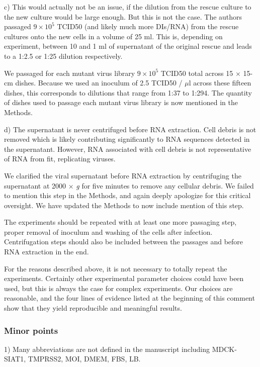 \documentclass[11pt, oneside]{article}   	%
\newcommand{\response}[1]{{\color{black}#1}}
\begin{document}
c) This would actually not be an issue, if the dilution from the rescue culture to the new culture would be large enough. But this is not the case. The authors passaged $9\times10^5$ TCID50 (and likely much more DIs/RNA) from the rescue cultures onto the new cells in a volume of 25 ml. This is, depending on experiment, between 10 and 1 ml of supernatant of the original rescue and leads to a 1:2.5 or 1:25 dilution respectively. 

\response{We passaged for each mutant virus library $9\times10^5$ TCID50 total across 15 $\times$ 15-cm dishes.
Because we used an inoculum of 2.5 TCID50 / $\mu$l across these fifteen dishes, this corresponds to dilutions that range from 1:37 to 1:294.
The quantity of dishes used to passage each mutant virus library is now mentioned in the Methods.
}

d) The supernatant is never centrifuged before RNA extraction. Cell debris is not removed which is likely contributing significantly to RNA sequences detected in the supernatant. However, RNA associated with cell debris is not representative of RNA from fit, replicating viruses. 

\response{We clarified the viral supernatant before RNA extraction by centrifuging the supernatant at 2000 $\times$ \textit{g} for five minutes to remove any cellular debris.
We failed to mention this step in the Methods, and again deeply apologize for this critical oversight.
We have updated the Methods to now include mention of this step.
}

The experiments should be repeated with at least one more passaging step, proper removal of inoculum and washing of the cells after infection. Centrifugation steps should also be included between the passages and before RNA extraction in the end. 

\response{For the reasons described above, it is not necessary to totally repeat the experiments.
Certainly other experimental parameter choices could have been used, but this is always the case for complex experiments.
Our choices are reasonable, and the four lines of evidence listed at the beginning of this comment show that they yield reproducible and meaningful results.}

\subsubsection*{Minor points} 

1) Many abbreviations are not defined in the manuscript including MDCK-SIAT1, TMPRSS2, MOI, DMEM, FBS, LB. 
\end{document}
